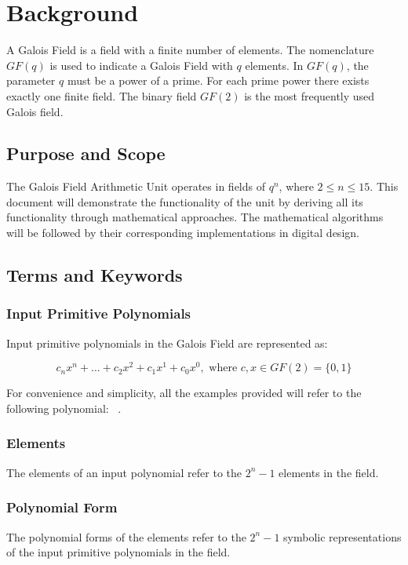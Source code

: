 \section{Background} A Galois Field is a field with a finite number of
elements. The nomenclature $GF(q)$ is used to indicate a Galois Field with $q$
elements. In $GF(q)$, the parameter $q$ must be a power of a prime. For each
prime power there exists exactly one finite field. The binary field $GF(2)$ is
the most frequently used Galois field. \cite{finitefield}

    \subsection{Purpose and Scope} The Galois Field Arithmetic Unit
    operates in fields of $q^n$, where $2 \leq n \leq 15$. This document
    will demonstrate the functionality of the unit by deriving all its
    functionality through mathematical approaches. The mathematical
    algorithms will be followed by their corresponding implementations in
    digital design.

    \subsection{Terms and Keywords}

        \subsubsection{Input Primitive Polynomials} Input primitive
        polynomials in the Galois Field are represented as:

        \[ c_{n}x^{n}+\ldots+c_{2}x^{2}+c_{1}x^{1}+c_{0}x^{0}, \text{ where } c,x \in GF(2)=\{0,1\} \]

        For convenience and simplicity, all the examples provided will
        refer to the following polynomial: \examplepoly~.

        \subsubsection{Elements} The elements of an input polynomial refer
        to the $2^{n}-1$ elements in the field.

        \subsubsection{Polynomial Form} The polynomial forms of the
        elements refer to the $2^{n}-1$ symbolic representations of the input
        primitive polynomials in the field.

